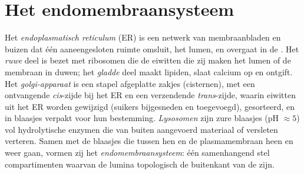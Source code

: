 \section{Het endomembraansysteem}

\begin{definition}\label{def:b1:eukaryotic-cell:endomembrane}
Het \emph{endoplasmatisch reticulum} (ER) is een
netwerk van membraanbladen en buizen dat één aaneengesloten ruimte omsluit, het
lumen, en overgaat in de . Het
\emph{ruwe} deel is bezet met ribosomen die
de eiwitten die zij maken het lumen of de membraan in duwen; het
\emph{gladde} deel maakt lipiden, slaat
calcium op en ontgift. Het \emph{golgi-apparaat} is een
stapel afgeplatte zakjes (cisternen), met een ontvangende \emph{cis}-zijde bij het
ER en een verzendende \emph{trans}-zijde, waarin eiwitten uit het ER worden
gewijzigd (suikers bijgesneden en toegevoegd), gesorteerd, en in blaasjes verpakt
voor hun bestemming. \emph{Lysosomen} zijn zure blaasjes (pH
$\approx 5$) vol hydrolytische enzymen die van buiten aangevoerd materiaal of
versleten  verteren. Samen met de blaasjes die tussen hen en de
plasmamembraan heen en weer gaan, vormen zij het
\emph{endomembraansysteem}: één samenhangend stel
compartimenten waarvan de lumina topologisch de buitenkant van de  zijn.
\end{definition}

